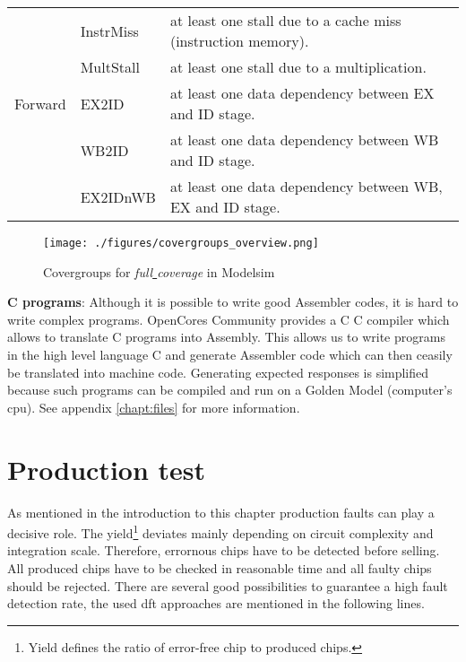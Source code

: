 \begin{table}[htbp]
\begin{tabular}{l l p{8cm}}
  & InstrMiss & at least one stall due to a cache miss (instruction memory). \\
  & MultStall & at least one stall due to a multiplication. \\ \hline
Forward & EX2ID & at least one data dependency between EX and ID stage. \\ 
 & WB2ID & at least one data dependency between WB and ID stage. \\
 & EX2IDnWB & at least one data dependency between WB, EX and ID stage.
\\ \hline
 \end{tabular}
\end{table}

\begin{figure}[tb]
  \centering
  \texttt{[image: ./figures/covergroups\_overview.png]}
  \caption{Covergroups for \textit{full\underline{ }coverage} in Modelsim}
  \label{fig:cov_over}
\end{figure}


\textbf{C programs}: 
Although it is possible to write good Assembler codes, it is hard to write complex programs. OpenCores Community provides a C C compiler which allows to translate C programs into Assembly. This allows us to write programs in the high level language C and generate Assembler code which can then ceasily be translated into machine code. Generating expected responses is simplified because such programs can be compiled and run on a Golden Model (computer's cpu). See appendix \ref{chapt:files} for more information.

\section{Production test}
As mentioned in the introduction to this chapter production faults can play a decisive role. The yield\footnote{Yield defines the ratio of error-free chip to produced chips.} deviates mainly depending on circuit complexity and integration scale. Therefore, errornous chips have to be detected before selling. All produced chips have to be checked in reasonable time and all faulty chips should be rejected. There are several good possibilities to guarantee a high fault detection rate, the used \gls{dft} approaches are mentioned in the following lines.

